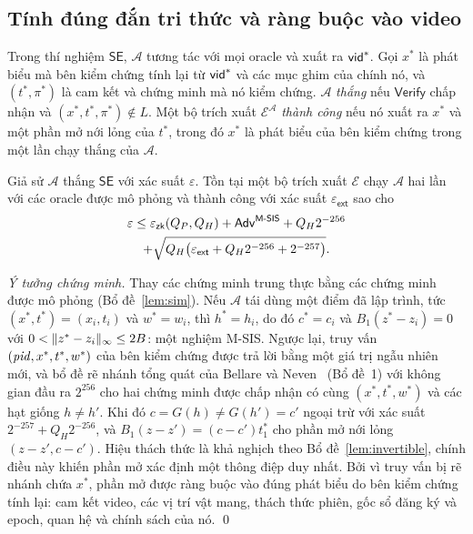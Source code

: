 \subsection{Tính đúng đắn tri thức và ràng buộc vào video}
\label{sec:sec-soundness}

\begin{definition}
\label{def:se}
Trong thí nghiệm $\mathsf{SE}$, $\mathcal A$ tương tác với mọi oracle và xuất
ra $\mathsf{vid}^*$. Gọi $x^*$ là phát biểu mà bên kiểm chứng tính lại từ $\mathsf{vid}^*$ và
các mục ghim của chính nó, và $(t^*,\pi^*)$ là cam kết và chứng minh mà nó kiểm
chứng. $\mathcal A$ \emph{thắng} nếu $\mathsf{Verify}$ chấp nhận và
$(x^*,t^*,\pi^*)\notin L$. Một bộ trích xuất $\mathcal E^{\mathcal A}$
\emph{thành công} nếu nó xuất ra $x^*$ và một phần mở nới lỏng của $t^*$, trong
đó $x^*$ là phát biểu của bên kiểm chứng trong một lần chạy thắng của $\mathcal A$.
\end{definition}

\begin{theorem}
\label{thm:se}
Giả sử $\mathcal A$ thắng $\mathsf{SE}$ với xác suất $\varepsilon$. Tồn tại một
bộ trích xuất $\mathcal E$ chạy $\mathcal A$ hai lần với các oracle được mô
phỏng và thành công với xác suất $\varepsilon_{\mathsf{ext}}$ sao cho
\begin{multline*}
\varepsilon\le\varepsilon_{\mathsf{zk}}(Q_P,Q_H)+\mathsf{Adv}^{\textsf{M-SIS}}+Q_H2^{-256}\\
+\sqrt{Q_H\bigl(\varepsilon_{\mathsf{ext}}+Q_H2^{-256}+2^{-257}\bigr)}.
\end{multline*}
\end{theorem}
\noindent
\emph{Ý tưởng chứng minh.} Thay các chứng minh trung thực bằng các chứng minh
được mô phỏng (Bổ đề~\ref{lem:sim}). Nếu $\mathcal A$ tái dùng một điểm đã lập
trình, tức $(x^*,t^*)=(x_i,t_i)$ và $w^*=w_i$, thì $h^*=h_i$, do đó $c^*=c_i$ và
$B_1(z^*-z_i)=0$ với $0<\lVert z^*-z_i \rVert_\infty\le2B$: một nghiệm M-SIS. Ngược
lại, truy vấn $(\mathit{pid},x^*,t^*,w^*)$ của bên kiểm chứng được trả lời bằng một giá
trị ngẫu nhiên mới, và bổ đề rẽ nhánh tổng quát của Bellare và
Neven~\cite{ref:bn06} (Bổ đề~1) với không gian đầu ra $2^{256}$ cho hai chứng
minh được chấp nhận có cùng $(x^*,t^*,w^*)$ và các hạt giống $h\neq h'$. Khi đó
$c=G(h)\neq G(h')=c'$ ngoại trừ với xác suất $2^{-257}+Q_H2^{-256}$, và
$B_1(z-z')=(c-c')t_1^*$ cho phần mở nới lỏng $(z-z',c-c')$. Hiệu thách thức là
khả nghịch theo Bổ đề~\ref{lem:invertible}, chính điều này khiến phần mở xác
định một thông điệp duy nhất. Bởi vì truy vấn bị rẽ nhánh chứa $x^*$, phần mở
được ràng buộc vào đúng phát biểu do bên kiểm chứng tính lại: cam kết video, các
vị trí vật mang, thách thức phiên, gốc sổ đăng ký và epoch, quan hệ và chính
sách của nó. \qed

